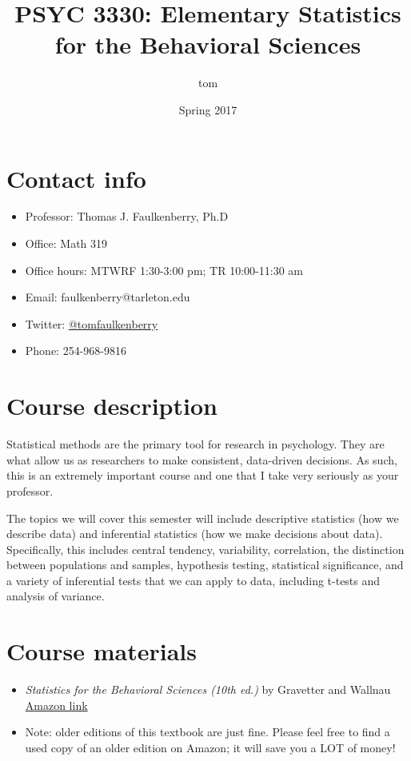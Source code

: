 \documentclass[10pt]{article}
\author{tom}
\date{Spring 2017}
\title{PSYC 3330: Elementary Statistics for the Behavioral Sciences}
\begin{document}
\maketitle

\section*{Contact info}
\label{sec-1}
\begin{itemize}
\item Professor: Thomas J. Faulkenberry, Ph.D
\item Office: Math 319
\item Office hours: MTWRF 1:30-3:00 pm; TR 10:00-11:30 am
\item Email: faulkenberry@tarleton.edu
\item Twitter: \href{http://twitter.com/tomfaulkenberry}{@tomfaulkenberry}
\item Phone: 254-968-9816
\end{itemize}

\section*{Course description}
\label{sec-2}

Statistical methods are the primary tool for research in psychology.  
They are what allow us as researchers to make consistent, data-driven 
decisions.  As such, this is an extremely important course and one that I 
take very seriously as your professor.

The topics we will cover this semester will include descriptive statistics 
(how we describe data) and inferential statistics (how we make decisions 
about data).  Specifically, this includes central tendency, variability, 
correlation, the distinction between populations and samples, hypothesis 
testing, statistical significance, and a variety of inferential tests 
that we can apply to data, including t-tests and analysis of variance.

\section*{Course materials}
\label{sec-3}
\begin{itemize}
\item \emph{Statistics for the Behavioral Sciences (10th ed.)} by Gravetter and Wallnau \href{http://www.amazon.com/Statistics-Behavioral-Sciences-MindTap-Psychology/dp/1305504917/}{Amazon link}
\item Note:  older editions of this textbook are just fine.  Please feel free to find a used copy of an older edition on Amazon; it will save you a LOT of money!
\end{itemize}
\end{document}
